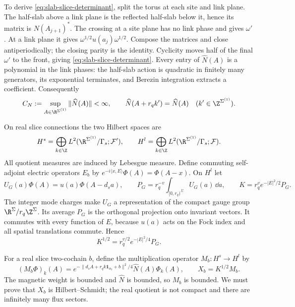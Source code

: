To derive \eqref{eq:slab-slice-determinant}, split the torus at each
site and link plane. The half-slab above a link plane is the reflected
half-slab below it, hence its matrix is $N(A_{j+1})^*$. The crossing
at a site plane has no link phase and gives $\omega'$. At a link
plane it gives $\omega^{1/2}u(a_j)\omega^{1/2}$. Compose the matrices
and close antiperiodically; the closing parity is the identity.
Cyclicity moves half of the final $\omega'$ to the front, giving
\eqref{eq:slab-slice-determinant}. Every entry of $\widehat N(A)$ is
a polynomial in the link phases: the half-slab action is quadratic
in finitely many generators, its exponential terminates, and
Berezin integration extracts a coefficient. Consequently
\begin{equation}\label{eq:slab-half-matrix-bound}
 C_N:=\sup_{A\in\R^{\Sigma^{(1)}}}\|\widehat N(A)\|<\infty,
 \qquad\widehat N(A+r_qk')=\widehat N(A)
       \quad(k'\in\Z^{\Sigma^{(1)}}).
\end{equation}

On real slice connections the two Hilbert spaces are
\[
 H^s=\bigoplus_{k\in\Z}
      L^2(\R^{\Sigma^{(1)}}/\Gamma_s;\mathcal F'),\qquad
 H^l=\bigoplus_{k\in\Z}
      L^2(\R^{\Sigma^{(1)}}/\Gamma_s;\mathcal F).
\]
All quotient measures are induced by Lebesgue measure. Define commuting
self-adjoint electric operators $E_b$ by
$e^{-i\langle x,E\rangle}\Phi(A)=\Phi(A-x)$. On $H^l$ let
\begin{equation}\label{eq:slab-electric-operators}
 U_G(a)\Phi(A)=u(a)\Phi(A-d_sa),\qquad
 P_G=r_q^{-v}\int_{[0,r_q)^{\Sigma}}U_G(a)\,\dd a,
 \qquad K=r_q^ve^{-|E|^2/2}P_G.
\end{equation}
The integer mode charges make $U_G$ a representation of the compact
gauge group $\R^{\Sigma}/r_q\Z^{\Sigma}$. Its average $P_G$ is the
orthogonal projection onto invariant vectors. It commutes with every
function of $E$, because $u(a)$ acts on the Fock index and all spatial
translations commute. Hence
\begin{equation}\label{eq:slab-electric-square-root}
 K^{1/2}=r_q^{v/2}e^{-|E|^2/4}P_G.
\end{equation}

For a real slice two-cochain $b$, define the multiplication operator
$M_b:H^s\to H^l$ by
\begin{equation}\label{eq:slab-magnetic-multiplier}
 (M_b\Phi)_k(A)=
     e^{-\|d_sA+r_qk\mathbf1_{\sigma_0}+b\|^2/4}
                                      \widehat N(A)\Phi_k(A),
 \qquad X_b=K^{1/2}M_b.
\end{equation}
The magnetic weight is bounded and $\widehat N$ is bounded, so $M_b$
is bounded. We must prove that $X_b$ is Hilbert--Schmidt; the real
quotient is not compact and there are infinitely many flux sectors.

